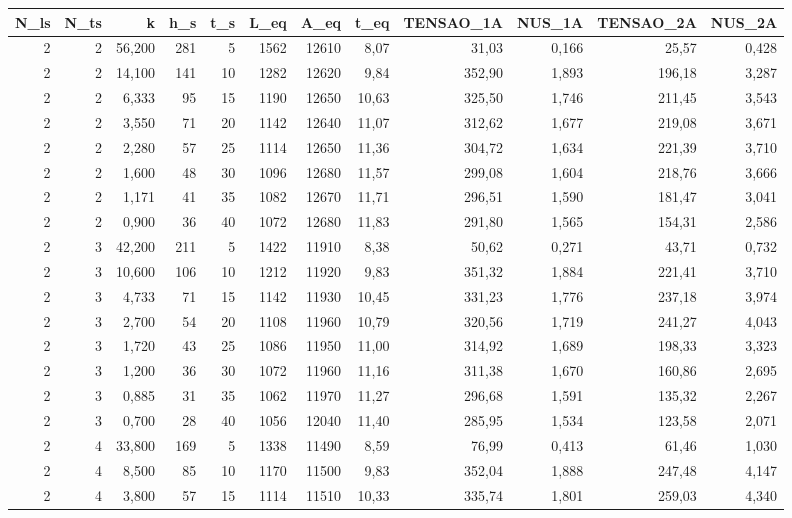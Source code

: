 \begin{tabular}{rrrrrrrrrrrr}
\toprule
N_ls & N_ts & k & h_s & t_s & L_eq & A_eq & t_eq & TENSAO_1A & NUS_1A & TENSAO_2A & NUS_2A \\ \hline
\midrule
2 & 2 & 56,200 & 281 & 5 & 1562 & 12610 & 8,07 & 31,03 & 0,166 & 25,57 & 0,428 \\ \hline
2 & 2 & 14,100 & 141 & 10 & 1282 & 12620 & 9,84 & 352,90 & 1,893 & 196,18 & 3,287 \\ \hline
2 & 2 & 6,333 & 95 & 15 & 1190 & 12650 & 10,63 & 325,50 & 1,746 & 211,45 & 3,543 \\ \hline
2 & 2 & 3,550 & 71 & 20 & 1142 & 12640 & 11,07 & 312,62 & 1,677 & 219,08 & 3,671 \\ \hline
2 & 2 & 2,280 & 57 & 25 & 1114 & 12650 & 11,36 & 304,72 & 1,634 & 221,39 & 3,710 \\ \hline
2 & 2 & 1,600 & 48 & 30 & 1096 & 12680 & 11,57 & 299,08 & 1,604 & 218,76 & 3,666 \\ \hline
2 & 2 & 1,171 & 41 & 35 & 1082 & 12670 & 11,71 & 296,51 & 1,590 & 181,47 & 3,041 \\ \hline
2 & 2 & 0,900 & 36 & 40 & 1072 & 12680 & 11,83 & 291,80 & 1,565 & 154,31 & 2,586 \\ \hline
2 & 3 & 42,200 & 211 & 5 & 1422 & 11910 & 8,38 & 50,62 & 0,271 & 43,71 & 0,732 \\ \hline
2 & 3 & 10,600 & 106 & 10 & 1212 & 11920 & 9,83 & 351,32 & 1,884 & 221,41 & 3,710 \\ \hline
2 & 3 & 4,733 & 71 & 15 & 1142 & 11930 & 10,45 & 331,23 & 1,776 & 237,18 & 3,974 \\ \hline
2 & 3 & 2,700 & 54 & 20 & 1108 & 11960 & 10,79 & 320,56 & 1,719 & 241,27 & 4,043 \\ \hline
2 & 3 & 1,720 & 43 & 25 & 1086 & 11950 & 11,00 & 314,92 & 1,689 & 198,33 & 3,323 \\ \hline
2 & 3 & 1,200 & 36 & 30 & 1072 & 11960 & 11,16 & 311,38 & 1,670 & 160,86 & 2,695 \\ \hline
2 & 3 & 0,885 & 31 & 35 & 1062 & 11970 & 11,27 & 296,68 & 1,591 & 135,32 & 2,267 \\ \hline
2 & 3 & 0,700 & 28 & 40 & 1056 & 12040 & 11,40 & 285,95 & 1,534 & 123,58 & 2,071 \\ \hline
2 & 4 & 33,800 & 169 & 5 & 1338 & 11490 & 8,59 & 76,99 & 0,413 & 61,46 & 1,030 \\ \hline
2 & 4 & 8,500 & 85 & 10 & 1170 & 11500 & 9,83 & 352,04 & 1,888 & 247,48 & 4,147 \\ \hline
2 & 4 & 3,800 & 57 & 15 & 1114 & 11510 & 10,33 & 335,74 & 1,801 & 259,03 & 4,340 \\ \hline

\end{tabular}
